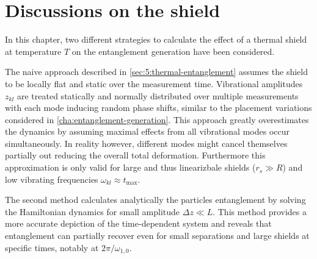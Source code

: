 \section{Discussions on the shield} \label{sec:5:discussion}

In this chapter, two different strategies to calculate the effect of a thermal shield at temperature $T$ on the entanglement generation have been considered. 

The naive approach described in \cref{sec:5:thermal-entanglement} assumes the shield to be locally flat and static over the measurement time. Vibrational amplitudes $z_{kl}$ are treated statically and normally distributed over multiple measurements with each mode inducing random phase shifts, similar to the placement variations considered in \cref{cha:entanglement-generation}.
This approach greatly overestimates the dynamics by assuming maximal effects from all vibrational modes occur simultaneously. In reality however, different modes might cancel themselves partially out reducing the overall total deformation.
Furthermore this approximation is only valid for large and thus linearizbale shields ($r_s \gg R$) and low vibrating frequencies $\omega_{kl} \approx t_\mathrm{max}$.

The second method calculates analytically the particles entanglement by solving the Hamiltonian dynamics for small amplitude $\Delta z \ll L$. This method provides a more accurate depiction of the time-dependent system and reveals that entanglement can partially recover even for small separations and large shields at specific times, notably at $2\pi/\omega_{1,0}$.

